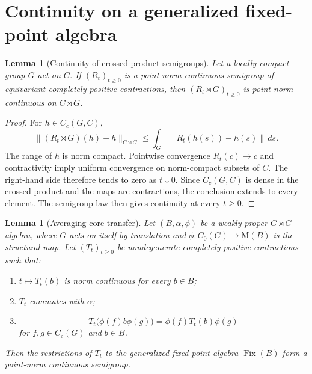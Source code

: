 \documentclass[11pt]{article}
\newtheorem{lemma}[theorem]{Lemma}
\theoremstyle{remark}
\newcommand{\M}{\mathrm M}
\newcommand{\Fix}{\operatorname{Fix}}
\begin{document}
\section{\hspace{0.35em}Continuity on a generalized fixed-point algebra}

\begin{lemma}[Continuity of crossed-product semigroups]
\label{lem:crossed-c0}
Let a locally compact group $G$ act on $C$. If $(R_t)_{t\geq0}$ is a
point-norm continuous semigroup of equivariant completely positive
contractions, then $(R_t\rtimes G)_{t\geq0}$ is point-norm continuous on
$C\rtimes G$.
\end{lemma}

\begin{proof}
For $h\in C_c(G,C)$,
\[
 \|(R_t\rtimes G)(h)-h\|_{C\rtimes G}
 \leq \int_G\|R_t(h(s))-h(s)\|\,ds .
\]
The range of $h$ is norm compact. Pointwise convergence $R_t(c)\to c$ and
contractivity imply uniform convergence on norm-compact subsets of $C$.
The right-hand side therefore tends to zero as $t\downarrow0$. Since
$C_c(G,C)$ is dense in the crossed product and the maps are contractions,
the conclusion extends to every element. The semigroup law then gives
continuity at every $t\geq0$.
\end{proof}

\begin{lemma}[Averaging-core transfer]\label{lem:averaging}
Let $(B,\alpha,\phi)$ be a weakly proper $G\rtimes G$-algebra, where $G$
acts on itself by translation and
$\phi:C_0(G)\to\M(B)$ is the structural map. Let $(T_t)_{t\geq0}$ be
nondegenerate completely positive contractions such that:
\begin{enumerate}
  \item $t\mapsto T_t(b)$ is norm continuous for every $b\in B$;
  \item $T_t$ commutes with $\alpha$;
  \item
  \[
   T_t\bigl(\phi(f)b\phi(g)\bigr)
   =\phi(f)T_t(b)\phi(g)
  \]
  for $f,g\in C_c(G)$ and $b\in B$.
\end{enumerate}
Then the restrictions of $T_t$ to the generalized fixed-point algebra
$\Fix(B)$ form a point-norm continuous semigroup.
\end{lemma}
\end{document}
